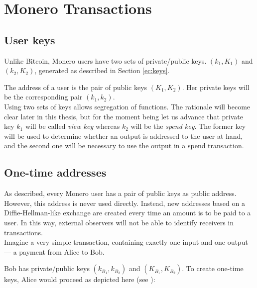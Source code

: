 

\chapter{Monero Transactions}
\label{chapter:transactions}

\section{User keys}

Unlike Bitcoin, Monero users have two sets of private/public keys. 
\((k_1, K_1)\) and \( (k_2, K_2) \), generated as described in Section \ref{ec:keys}.

The address of a user is the pair of public keys \((K_1, K_2)\). Her private keys will be the corresponding pair \( (k_1, k_2) \).
\\

Using two sets of keys allows segregation of functions. The rationale will become clear later in this 
thesis, but for the moment being let us advance that private key \(k_1\) will be called {\em view key} 
whereas \(k_2\) will be the {\em spend key}. The former key will be used to determine whether an output is
addressed to the user at hand, and the second one will be necessary to use the output in a spend
transaction. 




\section{One-time addresses}
\label{sec:one-time-addresses}

As described, every Monero user has a pair of public keys as public address. 
However, this address is never used directly.
Instead, new addresses based on a Diffie-Hellman-like exchange are created every time an amount is to be paid to a user.
In this way, external observers will not be able to identify receivers in transactions.
\\

Imagine a very simple transaction, containing exactly one input and one output --- a payment from Alice to Bob.

Bob has private/public keys \((k_{B_1}, k_{B_2})\) and \((K_{B_1}, K_{B_2})\).
To create one-time keys, Alice would proceed as depicted here (see \cite{cryptoNoteWhitePaper}):


